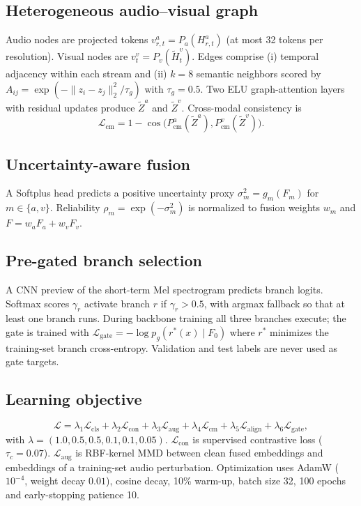 \subsection{Heterogeneous audio--visual graph}
Audio nodes are projected tokens \(v^{a}_{r,t}=P_a(H^{a}_{r,t})\) (at most 32 tokens per resolution). Visual nodes are \(v^{v}_{t}=P_v(\tilde H^{v}_{t})\). Edges comprise (i) temporal adjacency within each stream and (ii) \(k=8\) semantic neighbors scored by \(A_{ij}=\exp(-\|z_i-z_j\|_2^2/\tau_g)\) with \(\tau_g=0.5\). Two ELU graph-attention layers with residual updates produce \(\tilde Z^{a}\) and \(\tilde Z^{v}\). Cross-modal consistency is
\begin{equation}
\mathcal L_{\mathrm{cm}}=1-\cos\big(P_{\mathrm{cm}}^{a}(\tilde Z^{a}),P_{\mathrm{cm}}^{v}(\tilde Z^{v})\big).
\end{equation}

\subsection{Uncertainty-aware fusion}
A Softplus head predicts a positive uncertainty proxy \(\sigma_m^2=g_m(F_m)\) for \(m\in\{a,v\}\). Reliability \(\rho_m=\exp(-\sigma_m^2)\) is normalized to fusion weights \(w_m\) and \(F=w_a F_a+w_v F_v\).

\subsection{Pre-gated branch selection}
A CNN preview of the short-term Mel spectrogram predicts branch logits. Softmax scores \(\gamma_r\) activate branch \(r\) if \(\gamma_r>0.5\), with argmax fallback so that at least one branch runs. During backbone training all three branches execute; the gate is trained with \(\mathcal L_{\mathrm{gate}}=-\log p_g(r^*(x)\mid F_0)\) where \(r^*\) minimizes the training-set branch cross-entropy. Validation and test labels are never used as gate targets.

\subsection{Learning objective}
\begin{equation}
\mathcal L=\lambda_1\mathcal L_{\mathrm{cls}}+\lambda_2\mathcal L_{\mathrm{con}}+\lambda_3\mathcal L_{\mathrm{aug}}+\lambda_4\mathcal L_{\mathrm{cm}}+\lambda_5\mathcal L_{\mathrm{align}}+\lambda_6\mathcal L_{\mathrm{gate}},
\end{equation}
with \(\lambda=(1.0,0.5,0.5,0.1,0.1,0.05)\). \(\mathcal L_{\mathrm{con}}\) is supervised contrastive loss (\(\tau_c=0.07\)). \(\mathcal L_{\mathrm{aug}}\) is RBF-kernel MMD between clean fused embeddings and embeddings of a training-set audio perturbation. Optimization uses AdamW (\(10^{-4}\), weight decay \(0.01\)), cosine decay, 10\% warm-up, batch size 32, 100 epochs and early-stopping patience 10.
